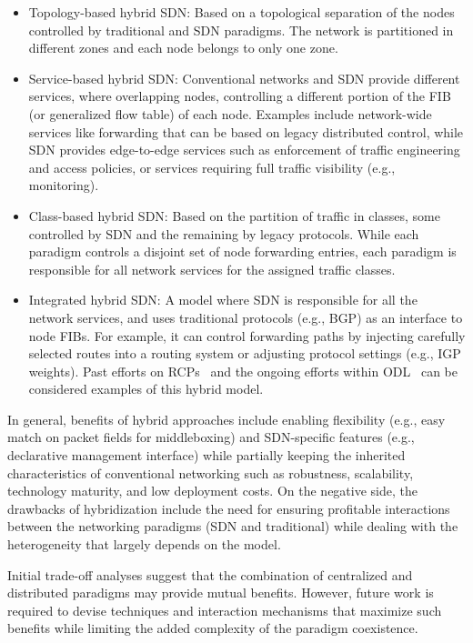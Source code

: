 \begin{itemize}
\item Topology-based hybrid SDN: Based on a topological separation of the nodes controlled by traditional and SDN 
paradigms. The network is partitioned in different zones and each node belongs to only one zone. 
\item Service-based hybrid SDN: Conventional networks and SDN provide different services, where overlapping nodes, 
controlling a different portion of the FIB (or generalized flow table) of each node. Examples include network-wide 
services like forwarding  that can be based on legacy distributed control, while SDN provides edge-to-edge services 
such as enforcement of traffic engineering and access policies, or services requiring full traffic visibility 
(e.g., monitoring).
\item Class-based hybrid SDN: Based on the partition of traffic in classes, some controlled by SDN and the remaining 
by legacy protocols. While each paradigm controls a disjoint set of node forwarding entries,  each paradigm is 
responsible for all network services for the assigned traffic classes. 
\item Integrated hybrid SDN: A model where SDN is responsible for all the network services, and
uses traditional protocols (e.g., BGP) as an interface to node FIBs. For example, it can control forwarding
paths by injecting carefully selected routes into a routing system or adjusting protocol settings (e.g., IGP weights). 
Past efforts on RCPs~\cite{caesar2005} and the ongoing efforts within ODL~\cite{opendaylight2013} can be considered 
examples of this hybrid model.
\end{itemize}

In general, benefits of hybrid approaches include enabling flexibility (e.g., easy match on packet fields for 
middleboxing) and SDN-specific features (e.g., declarative management interface) while partially keeping the inherited 
characteristics of conventional networking such as robustness, scalability, technology maturity, and low deployment 
costs. On the negative side, the drawbacks of hybridization include the need for ensuring profitable interactions 
between the networking paradigms (SDN and traditional) while dealing with the heterogeneity that largely depends on 
the model.

Initial trade-off analyses suggest that the combination of centralized and distributed paradigms may provide 
mutual benefits. However, future work is required to devise techniques and interaction mechanisms that maximize 
such benefits while limiting the added complexity of the paradigm coexistence.

